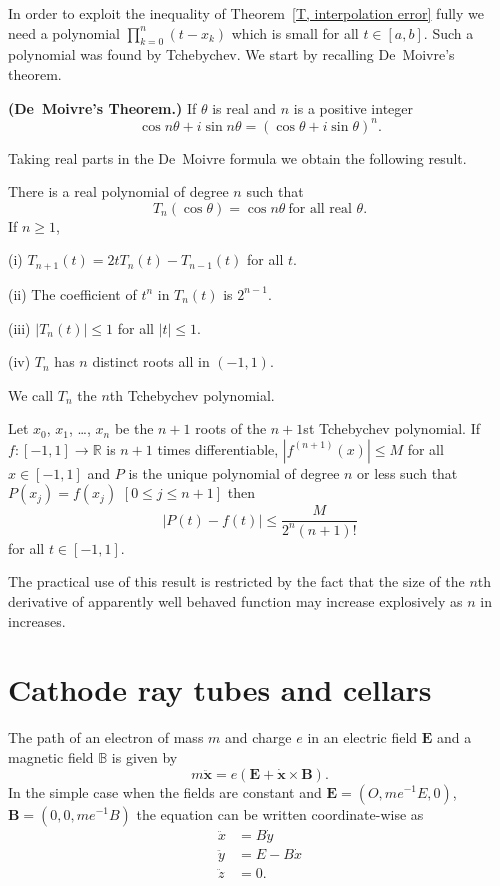 In order to exploit the inequality of
Theorem~\ref{T, interpolation error} fully we need a polynomial
$\prod_{k=0}^{n}(t-x_{k})$ which is small for all $t\in[a,b]$.
Such a polynomial was found by Tchebychev.
We start by recalling De~Moivre's theorem.
\begin{theorem}{\bf (De~Moivre's Theorem.)}
If $\theta$ is real and $n$ is a positive integer
\[\cos n\theta+i\sin n\theta=(\cos\theta+i\sin\theta)^{n}.\]
\end{theorem}
Taking real parts in the De~Moivre formula we obtain the following result.
\begin{lemma}\label{L, Tchebychev} There is
a real polynomial of degree $n$ such that
\[T_{n}(\cos\theta)=\cos n\theta
\ \text{for all real $\theta$.}\]
If $n\geq 1$,

(i) $T_{n+1}(t)=2tT_{n}(t)-T_{n-1}(t)$ for all $t$.

(ii) The coefficient of $t^{n}$ in $T_{n}(t)$ is $2^{n-1}$.

(iii) $|T_{n}(t)|\leq 1$ for all $|t|\leq 1$.

(iv) $T_{n}$ has $n$ distinct roots all in $(-1,1)$.
\end{lemma}

We call $T_{n}$ the $n$th Tchebychev polynomial.
\begin{theorem}
Let $x_{0}$, $x_{1}$, \dots, $x_{n}$ be the $n+1$ roots
of the $n+1$st Tchebychev polynomial.
If $f:[-1,1]\rightarrow{\mathbb R}$
is $n+1$ times differentiable, $|f^{(n+1)}(x)|\leq M$
for all $x\in[-1,1]$ and $P$ is the unique polynomial
of degree $n$ or less such that $P(x_{j})=f(x_{j})$
$[0\leq j\leq n+1]$ then
\[|P(t)-f(t)|\leq \frac{M}{2^{n}(n+1)!}\]
for all $t\in[-1,1]$.
\end{theorem}
The practical use of this result is restricted
by the fact that the size of the $n$th derivative
of apparently well behaved function may increase explosively
as $n$ in increases.

\section{Cathode ray tubes and cellars}\label{S, Electron}
The path of an electron of mass $m$ and charge $e$
in an electric field ${\mathbf E}$
and a magnetic field ${\mathbb B}$ is given by
\[m\ddot{\mathbf x}=e({\mathbf E}+\dot{\mathbf x}\times {\mathbf B}).\]
In the simple case when the fields are constant
and ${\mathbf E}=(O,me^{-1}E,0)$, ${\mathbf B}=(0,0,me^{-1}B)$
the equation can be written coordinate-wise as
\begin{align*}
\ddot{x}&=B\dot{y}\\
\ddot{y}&=E-B\dot{x}\\
\ddot{z}&=0.
\end{align*}

